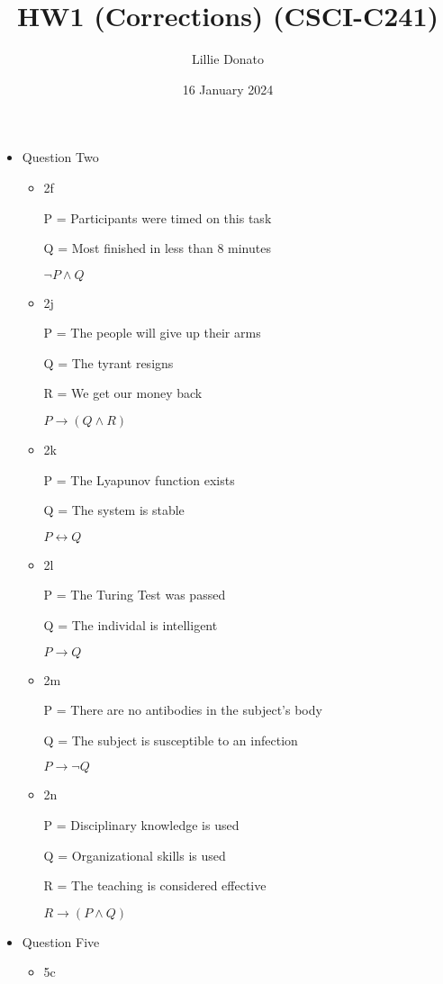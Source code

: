 \documentclass{article}
\title{HW1 (Corrections) (CSCI-C241)}
\author{Lillie Donato}
\date{16 January 2024}
\begin{document}
\maketitle

\begin{itemize}
    \item Question Two
    \begin{itemize}
        \item 2f

        P = Participants were timed on this task

        Q = Most finished in less than 8 minutes

        $\neg P \land Q$
        \item 2j
        
        P = The people will give up their arms

        Q = The tyrant resigns

        R = We get our money back

        $P \rightarrow (Q \land R)$
        \item 2k
        
        P = The Lyapunov function exists

        Q = The system is stable

        $P \leftrightarrow Q$
        \item 2l
        
        P = The Turing Test was passed

        Q = The individal is intelligent

        $P \rightarrow Q$
        \item 2m
        
        P = There are no antibodies in the subject’s body

        Q = The subject is susceptible to an infection

        $P \rightarrow \neg Q$
        \item 2n
        
        P = Disciplinary knowledge is used

        Q = Organizational skills is used

        R = The teaching is considered effective

        $R \rightarrow (P \land Q)$
    \end{itemize}
    \item Question Five
    \begin{itemize}
        \item 5c
        

\end{itemize}
\end{itemize}
\end{document}
